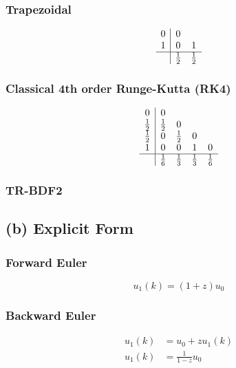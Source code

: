 \documentclass{article}
\begin{document}
\subsubsection*{Trapezoidal}
\begin{equation}
\begin{array}{c|cc}
0 & 0 \\
1 & 0 & 1 \\
\hline
& \frac{1}{2} & \frac{1}{2}
\end{array}
\end{equation}

\subsubsection*{Classical 4th order Runge-Kutta (RK4)}
\begin{equation}
\begin{array}{c|cccc}
0 & 0 \\
\frac{1}{2} & \frac{1}{2} & 0 \\
\frac{1}{2} & 0 & \frac{1}{2} & 0 \\
1 & 0 & 0 & 1 & 0 \\
\hline
& \frac{1}{6} & \frac{1}{3} & \frac{1}{3} & \frac{1}{6}
\end{array}
\end{equation}


\subsubsection*{TR-BDF2}

\subsection*{(b) Explicit Form}
\subsubsection*{Forward Euler}
\begin{equation}
u_1(k)=(1+z)u_0
\end{equation}

\subsubsection*{Backward Euler}
\begin{align}
u_1(k)&=u_0+zu_1(k) \nonumber\\
u_1(k)&=\frac{1}{1-z}u_0
\end{align}
\end{document}
